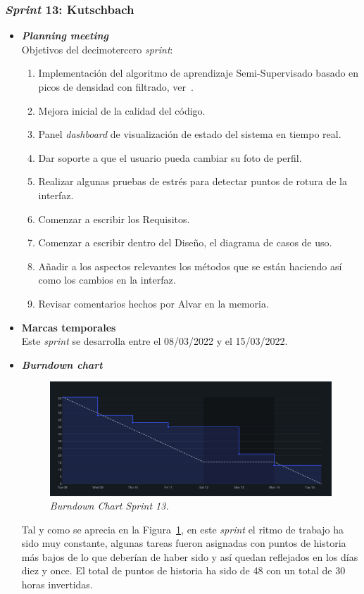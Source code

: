 \subsubsection{\textit{Sprint} 13: Kutschbach}
\begin{itemize}
\item \textbf{\textit{Planning meeting}}\\
Objetivos del decimotercero \textit{sprint}:
\begin{enumerate}
\item Implementación del algoritmo de aprendizaje Semi-Supervisado basado en picos de densidad con filtrado, ver~\cite{LI2019104895}.
\item Mejora inicial de la calidad del código.
\item Panel \textit{dashboard} de visualización de estado del sistema en tiempo real.
\item Dar soporte a que el usuario pueda cambiar su foto de perfil.
\item Realizar algunas pruebas de estrés para detectar puntos de rotura de la interfaz.
\item Comenzar a escribir los Requisitos.
\item Comenzar a escribir dentro del Diseño, el diagrama de casos de uso.
\item Añadir a los aspectos relevantes los métodos que se están haciendo así como los cambios en la interfaz.
\item Revisar comentarios hechos por Alvar en la memoria.
\end{enumerate}

\item \textbf{Marcas temporales}\\
Este \textit{sprint} se desarrolla entre el 08/03/2022 y el 15/03/2022.

\item \textbf{\textit{Burndown chart}}\\
\begin{figure}
\begin{center}
\includegraphics[width=\textwidth]{../img/anexos/sprints/BD-Sprint13}
\caption{\textit{Burndown Chart Sprint 13.}}\label{fig:BD-Sprint13}
\end{center}
\end{figure}
Tal y como se aprecia en la Figura~\ref{fig:BD-Sprint13}, en este \textit{sprint} el ritmo de trabajo ha sido muy constante, algunas tareas fueron asignadas con puntos de historia más bajos de lo que deberían de haber sido y así quedan reflejados en los días diez y once. El total de puntos de historia ha sido de 48 con un total de 30 horas invertidas.


\end{itemize}
